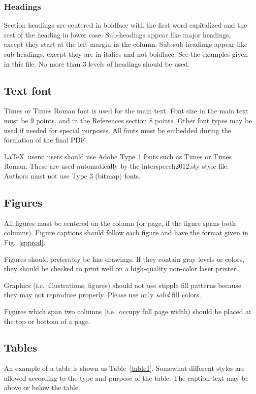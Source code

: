 \documentclass[a4paper]{article}
\begin{document}
\subsubsection{Headings}
Section headings are centered in boldface with the first word capitalized and the rest of the heading in lower case.
Sub-headings appear like major headings, except they start at the left margin in the column.
Sub-sub-headings appear like sub-headings, except they are in italics and not boldface.
See the examples given in this file.
No more than 3 levels of headings should be used.


\subsection{Text font}
Times or Times Roman font is used for the main text. 
Font size in the main text must be 9 points, and in the References section 8 points.
Other font types may be used if needed for special purposes.
All fonts must be embedded during the formation of the final PDF.

\LaTeX\ users: users should use Adobe Type 1 fonts such as Times or Times Roman.
These are used automatically by the interspeech2012.sty style file.
Authors must not use Type 3 (bitmap) fonts.


\subsection{Figures}
All figures must be centered on the column (or page, if the figure spans both columns).
Figure captions should follow each figure and have the format given in Fig.~\ref{spprod}.

Figures should preferably be line drawings.
If they contain gray levels or colors, they should be checked to print well on a high-quality non-color laser printer.

Graphics (i.\thinspace{}e.\ illustrations, figures) should not use stipple fill patterns because they may not reproduce properly.
Please use only \emph{solid} fill colors.

Figures which span two columns (i.\thinspace{}e.\ occupy full page width) should be placed at the top or bottom of a page.


\subsection{Tables}
An example of a table is shown as Table~\ref{table1}.
Somewhat different styles are allowed according to the type and purpose of the table.
The caption text may be above or below the table.
\end{document}
